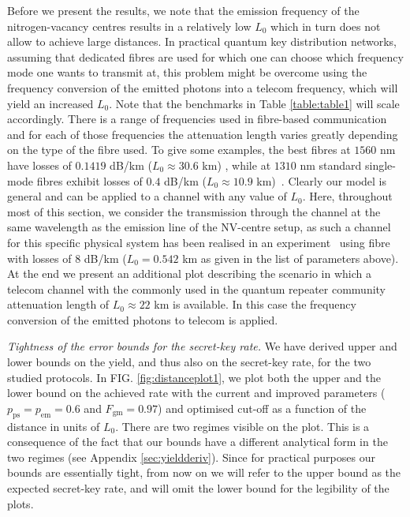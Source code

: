 \documentclass[aps,pra,reprint,superscriptaddress]{revtex4-1}
\begin{document}
Before we present the results, we note that the emission frequency of the nitrogen-vacancy centres results in a relatively low $L_0$ which in turn does not allow to achieve large distances.
In practical quantum key distribution networks, assuming that dedicated fibres are used for which one can choose which frequency mode one wants to transmit at, this problem might be overcome using the frequency conversion of the emitted photons into a telecom frequency, which will yield an increased $L_0$. Note that the benchmarks in Table \ref{table:table1} will scale accordingly. There is a range of frequencies used in fibre-based communication and for each of those frequencies the attenuation length varies greatly depending on the type of the fibre used. To give some examples, the best fibres at $1560$ nm have losses of $0.1419$ dB/km ($L_0 \approx 30.6$ km) \cite{tamura2017lowest}, while at $1310$ nm standard single-mode fibres exhibit losses of $0.4$ dB/km ($L_0 \approx 10.9$ km)~\cite{keiser2011optical}. 
Clearly our model is general and can be applied to a channel with any value of $L_0$. Here, throughout most of this section, we consider the transmission through the channel at the same wavelength as the emission line of the NV-centre setup, as such a channel for this specific physical system has been realised in an experiment~\cite{hensen2015loophole} using fibre with losses of $8$ dB/km ($L_0 = 0.542$ km as given in the list of parameters above). At the end we present an additional plot describing the scenario in which a telecom channel with the commonly used in the quantum repeater community attenuation length of $L_0 \approx 22$ km is available. In this case the frequency conversion of the emitted photons to telecom is applied.

\smallskip
\textit{Tightness of the error bounds for the secret-key rate.} We have derived upper and lower bounds on the yield, and thus also on the secret-key rate, for the two studied protocols. In FIG. \ref{fig:distanceplot1}, we plot both the upper and the lower bound on the achieved rate with the current and improved parameters ($p_{\textrm{ps}} = p_{\textrm{em}} = 0.6$ and $F_{\textrm{gm}} = 0.97$) and optimised cut-off as a function of the distance in units of $L_0$. 
There are two regimes visible on the plot. This is a consequence of the fact that our bounds have a different analytical form in the two regimes (see Appendix \ref{sec:yieldderiv}). Since for practical purposes our bounds are essentially tight, from now on we will refer to the upper bound as the expected secret-key rate, and will omit the lower bound for the legibility of the plots. 
\end{document}
